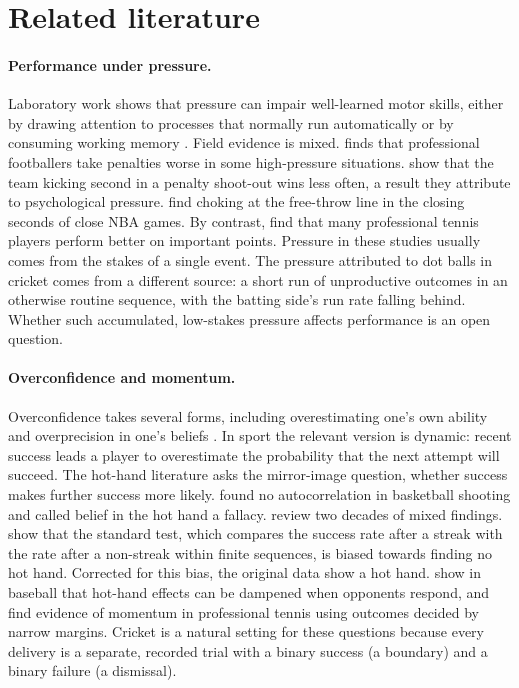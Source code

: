 \documentclass[11pt]{article}
\begin{document}
\section{Related literature}\label{sec:lit}

\paragraph{Performance under pressure.} Laboratory work shows that pressure can impair well-learned motor skills, either by drawing attention to processes that normally run automatically or by consuming working memory \citep{baumeister1984choking,beilock2001fragility}. Field evidence is mixed. \citet{dohmen2008professionals} finds that professional footballers take penalties worse in some high-pressure situations. \citet{apesteguia2010psychological} show that the team kicking second in a penalty shoot-out wins less often, a result they attribute to psychological pressure. \citet{cao2011performance} find choking at the free-throw line in the closing seconds of close NBA games. By contrast, \citet{gonzalezdiaz2012performing} find that many professional tennis players perform better on important points. Pressure in these studies usually comes from the stakes of a single event. The pressure attributed to dot balls in cricket comes from a different source: a short run of unproductive outcomes in an otherwise routine sequence, with the batting side's run rate falling behind. Whether such accumulated, low-stakes pressure affects performance is an open question.

\paragraph{Overconfidence and momentum.} Overconfidence takes several forms, including overestimating one's own ability and overprecision in one's beliefs \citep{moore2008trouble}. In sport the relevant version is dynamic: recent success leads a player to overestimate the probability that the next attempt will succeed. The hot-hand literature asks the mirror-image question, whether success makes further success more likely. \citet{gilovich1985hot} found no autocorrelation in basketball shooting and called belief in the hot hand a fallacy. \citet{bareli2006twenty} review two decades of mixed findings. \citet{miller2018surprised} show that the standard test, which compares the success rate after a streak with the rate after a non-streak within finite sequences, is biased towards finding no hot hand. Corrected for this bias, the original data show a hot hand. \citet{green2018hot} show in baseball that hot-hand effects can be dampened when opponents respond, and \citet{gauriot2019success} find evidence of momentum in professional tennis using outcomes decided by narrow margins. Cricket is a natural setting for these questions because every delivery is a separate, recorded trial with a binary success (a boundary) and a binary failure (a dismissal).
\end{document}
